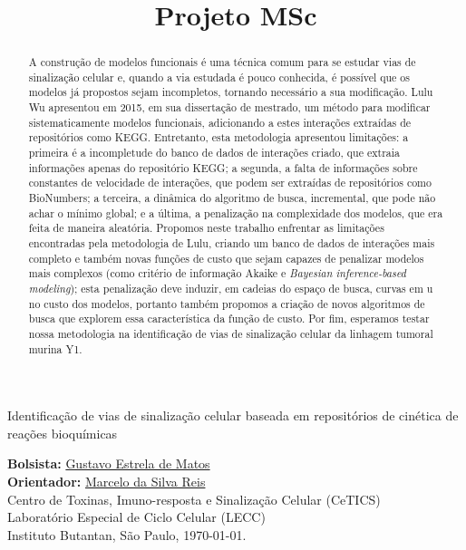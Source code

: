 \documentclass[12pt]{article}
\title{Projeto MSc}
\begin{document}
%
\doublespacing

\thispagestyle{empty} 
\begin{flushright}
    {\LARGE Identificação de vias de sinalização celular baseada em repositórios de cinética de reações bioquímicas}

  {\large {\bf Bolsista:} \href{mailto:gustavo.estrela.matos@usp.br}{Gustavo Estrela de Matos}\\ 
    {\bf Orientador:} \href{mailto:marcelo.reis@butantan.gov.br}{Marcelo da Silva Reis}}\\
  {\small Centro de Toxinas, Imuno-resposta e Sinalização Celular (CeTICS)\\
     Laboratório Especial de Ciclo Celular (LECC)}\\
  Instituto Butantan, São Paulo, \today.\\

\end{flushright}
\begin{abstract}
    
A construção de modelos funcionais é uma técnica comum para se 
estudar vias de sinalização celular e, quando a via estudada é pouco
conhecida, é possível que os modelos já propostos sejam incompletos, 
tornando necessário a sua modificação.
Lulu Wu apresentou em 2015, em sua dissertação de mestrado, um método 
para  modificar sistematicamente modelos funcionais, adicionando a estes
interações extraídas de repositórios como KEGG. Entretanto, esta 
metodologia apresentou limitações: a primeira é a incompletude do banco 
de dados de interações criado, que extraia informações apenas do 
repositório KEGG; a segunda, a falta de informações sobre constantes 
de velocidade de interações, que podem ser extraídas de repositórios 
como BioNumbers; a terceira, a dinâmica do algoritmo de busca, 
incremental, que pode não achar o mínimo global; e a última, a 
penalização na complexidade dos modelos, que era feita de maneira 
aleatória. Propomos neste trabalho enfrentar as limitações encontradas
pela metodologia de Lulu, criando um banco de dados de interações mais
completo e também novas funções de custo que sejam capazes de 
penalizar modelos mais complexos (como critério de informação Akaike e 
{\em Bayesian inference-based modeling}); esta penalização deve induzir,
em cadeias do  espaço de busca, curvas em u no custo dos modelos, 
portanto também propomos a criação de novos algoritmos de busca que 
explorem essa característica da função de custo. Por fim, esperamos 
testar nossa metodologia na identificação de vias de sinalização celular 
da linhagem tumoral murina Y1.
\end{abstract}
\end{document}
